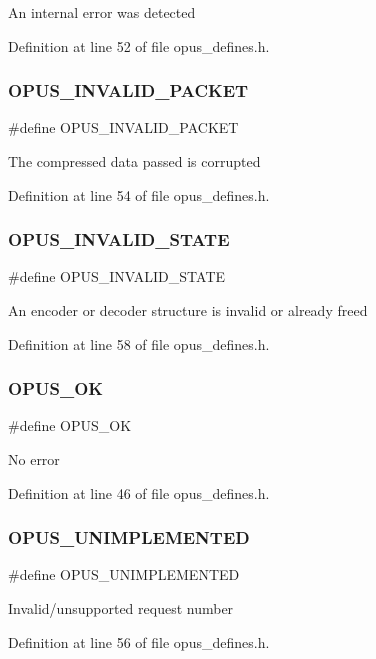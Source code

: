 An internal error was detected 

Definition at line 52 of file opus\+\_\+defines.\+h.

\mbox{\label{group__opus__errorcodes_ga46fc9dd493fb8e291bd8e838f0988bb7}} 
\subsubsection{\texorpdfstring{OPUS\_INVALID\_PACKET}{OPUS\_INVALID\_PACKET}}
{\footnotesize\ttfamily \#define O\+P\+U\+S\+\_\+\+I\+N\+V\+A\+L\+I\+D\+\_\+\+P\+A\+C\+K\+ET}

The compressed data passed is corrupted 

Definition at line 54 of file opus\+\_\+defines.\+h.

\mbox{\label{group__opus__errorcodes_ga54416ec79619179d688918f25e9b20e3}} 
\subsubsection{\texorpdfstring{OPUS\_INVALID\_STATE}{OPUS\_INVALID\_STATE}}
{\footnotesize\ttfamily \#define O\+P\+U\+S\+\_\+\+I\+N\+V\+A\+L\+I\+D\+\_\+\+S\+T\+A\+TE}

An encoder or decoder structure is invalid or already freed 

Definition at line 58 of file opus\+\_\+defines.\+h.

\mbox{\label{group__opus__errorcodes_gaa44cf8a185e1b5cb940ef63eb4f02d21}} 
\subsubsection{\texorpdfstring{OPUS\_OK}{OPUS\_OK}}
{\footnotesize\ttfamily \#define O\+P\+U\+S\+\_\+\+OK}

No error 

Definition at line 46 of file opus\+\_\+defines.\+h.

\mbox{\label{group__opus__errorcodes_ga3b8d73b0f44b8b925ff40fd7c02b14a0}} 
\subsubsection{\texorpdfstring{OPUS\_UNIMPLEMENTED}{OPUS\_UNIMPLEMENTED}}
{\footnotesize\ttfamily \#define O\+P\+U\+S\+\_\+\+U\+N\+I\+M\+P\+L\+E\+M\+E\+N\+T\+ED}

Invalid/unsupported request number 

Definition at line 56 of file opus\+\_\+defines.\+h.

